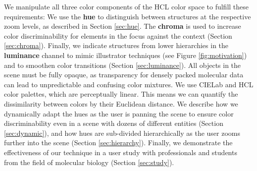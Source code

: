 \documentclass{egpubl}
\begin{document}
	We manipulate all three color components of the HCL color space to fulfill these requirements: 
	We use the \textbf{hue} to distinguish between structures at the respective zoom levels, as described in Section \ref{sec:hue}. 
	The \textbf{chroma} is used to increase color discriminability for elements in the focus against the context (Section \ref{sec:chroma}). 
	Finally, we indicate structures from lower hierarchies in the \textbf{luminance} channel to mimic illustrator techniques (see Figure \ref{fig:motivation}) and to smoothen color transitions (Section \ref{sec:luminance}).
	All objects in the scene must be fully opaque, as transparency for densely packed molecular data can lead to unpredictable and confusing color mixtures. 
	We use CIELab and HCL color palettes, which are perceptually linear. 
	This means we can quantify the dissimilarity between colors by their Euclidean distance.
	We describe how we dynamically adapt the hues as the user is panning the scene to ensure color discriminability even in a scene with dozens of different entities (Section \ref{sec:dynamic}), and how hues are sub-divided hierarchically as the user zooms further into the scene (Section \ref{sec:hierarchy}). 
	Finally, we demonstrate the effectiveness of our technique in a user study with professionals and students from the field of molecular biology (Section \ref{sec:study}). 
	
	
	
\end{document}
